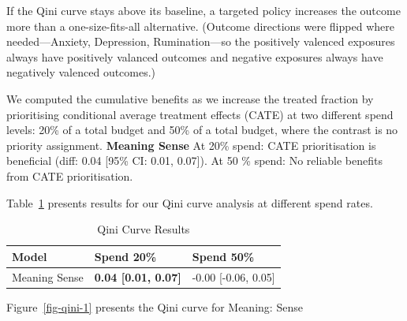 \documentclass[
  single column]{article}
\begin{document}
If the Qini curve stays above its baseline, a targeted policy increases
the outcome more than a one-size-fits-all alternative. (Outcome
directions were flipped where needed---Anxiety, Depression,
Rumination---so the positively valenced exposures always have positively
valanced outcomes and negative exposures always have negatively valenced
outcomes.)

We computed the cumulative benefits as we increase the treated fraction
by prioritising conditional average treatment effects (CATE) at two
different spend levels: 20\% of a total budget and 50\% of a total
budget, where the contrast is no priority assignment. \textbf{Meaning
Sense} At 20\% spend: CATE prioritisation is beneficial (diff: 0.04
{[}95\% CI: 0.01, 0.07{]}). At 50 \% spend: No reliable benefits from
CATE prioritisation.

Table~\ref{tbl-qini} presents results for our Qini curve analysis at
different spend rates.

\begin{longtable}[]{@{}lll@{}}

\caption{\label{tbl-qini}Qini Curve Results}

\tabularnewline

\toprule\noalign{}
Model & Spend 20\% & Spend 50\% \\
\midrule\noalign{}
\endhead
\bottomrule\noalign{}
\endlastfoot
Meaning Sense & \textbf{0.04 {[}0.01, 0.07{]}} & -0.00 {[}-0.06,
0.05{]} \\

\end{longtable}

Figure~\ref{fig-qini-1} presents the Qini curve for Meaning: Sense
\end{document}
